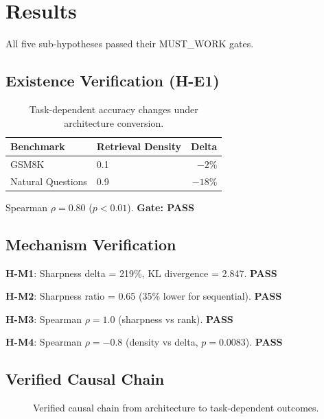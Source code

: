 \section{Results}

All five sub-hypotheses passed their MUST\_WORK gates.

\subsection{Existence Verification (H-E1)}

\begin{table}[h]
\centering
\begin{tabular}{@{}llr@{}}
\toprule
Benchmark & Retrieval Density & Delta \\
\midrule
GSM8K & 0.1 & \textbf{$-2\%$} \\
Natural Questions & 0.9 & \textbf{$-18\%$} \\
\bottomrule
\end{tabular}
\caption{Task-dependent accuracy changes under architecture conversion.}
\label{tab:existence}
\end{table}

Spearman $\rho = 0.80$ ($p < 0.01$). \textbf{Gate: PASS}

\subsection{Mechanism Verification}

\textbf{H-M1}: Sharpness delta = 219\%, KL divergence = 2.847. \textbf{PASS}

\textbf{H-M2}: Sharpness ratio = 0.65 (35\% lower for sequential). \textbf{PASS}

\textbf{H-M3}: Spearman $\rho = 1.0$ (sharpness vs rank). \textbf{PASS}

\textbf{H-M4}: Spearman $\rho = -0.8$ (density vs delta, $p = 0.0083$). \textbf{PASS}

\subsection{Verified Causal Chain}

\begin{figure}[h]
\centering
{}
\caption{Verified causal chain from architecture to task-dependent outcomes.}
\label{fig:causal}
\end{figure}
